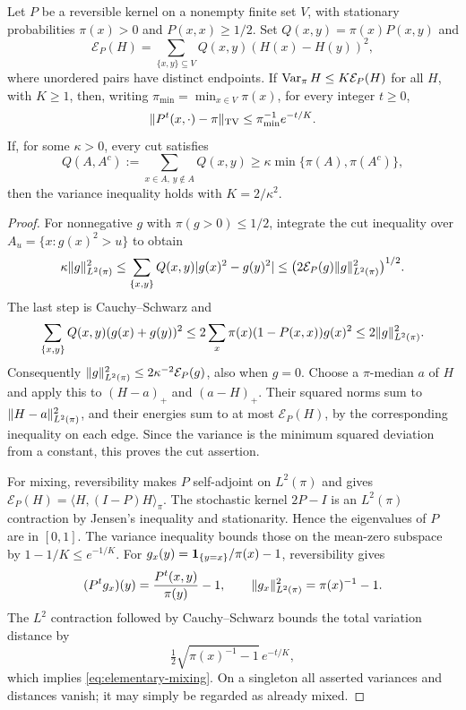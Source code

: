 \begin{lemma}\label{lem:mixing}
Let $P$ be a reversible kernel on a nonempty finite set $V$, with
stationary probabilities $\pi(x)>0$ and $P(x,x)\ge1/2$.
Set $Q(x,y)=\pi(x)P(x,y)$ and
\[
 \mathcal E_P(H)=\sum_{\{x,y\}\subseteq V}
 Q(x,y)(H(x)-H(y))^2,
\]
where unordered pairs have distinct endpoints.  If
$\operatorname{Var}_\pi H\le K\mathcal E_P(H)$ for all $H$, with $K\ge1$, then,
writing $\pi_{\min}=\min_{x\in V}\pi(x)$, for every integer $t\ge0$,
\begin{equation}\label{eq:elementary-mixing}
 \lVert P^t(x,\cdot)-\pi\rVert_{\operatorname{TV}}
 \le \pi_{\min}^{-1}e^{-t/K}.
\end{equation}
If, for some $\kappa>0$, every cut satisfies
\[
 Q(A,A^c):=\sum_{x\in A,\,y\notin A}Q(x,y)
 \ge\kappa\min\{\pi(A),\pi(A^c)\},
\]
then the variance inequality holds with $K=2/\kappa^2$.
\end{lemma}
\begin{proof}
For nonnegative $g$ with $\pi(g>0)\le1/2$, integrate the cut inequality
over $A_u=\{x:g(x)^2>u\}$ to obtain
\[
 \kappa\lVert g\rVert_{L^2(\pi)}^2
 \le\sum_{\{x,y\}}Q(x,y)|g(x)^2-g(y)^2|
 \le\bigl(2\mathcal E_P(g)\lVert g\rVert_{L^2(\pi)}^2\bigr)^{1/2}.
\]
The last step is Cauchy--Schwarz and
\[
 \sum_{\{x,y\}}Q(x,y)(g(x)+g(y))^2
 \le2\sum_x\pi(x)(1-P(x,x))g(x)^2
 \le2\lVert g\rVert_{L^2(\pi)}^2.
\]
Consequently $\lVert g\rVert_{L^2(\pi)}^2\le2\kappa^{-2}\mathcal E_P(g)$,
also when $g=0$.  Choose a $\pi$-median $a$ of $H$ and apply this to
$(H-a)_+$ and $(a-H)_+$.  Their squared norms sum to
$\lVert H-a\rVert_{L^2(\pi)}^2$, and their energies sum to at most
$\mathcal E_P(H)$, by the corresponding inequality on each edge.
Since the variance is the minimum squared deviation from a constant,
this proves the cut assertion.

For mixing, reversibility makes $P$ self-adjoint on $L^2(\pi)$ and gives
$\mathcal E_P(H)=\langle H,(I-P)H\rangle_\pi$.
The stochastic kernel $2P-I$ is an $L^2(\pi)$ contraction by Jensen's
inequality and stationarity.  Hence the eigenvalues of $P$ are in $[0,1]$.
The variance inequality bounds those on the mean-zero subspace by
$1-1/K\le e^{-1/K}$.  For
$g_x(y)=\mathbf{1}_{\{y=x\}}/\pi(x)-1$, reversibility gives
\[
 (P^tg_x)(y)=\frac{P^t(x,y)}{\pi(y)}-1,
 \qquad \lVert g_x\rVert_{L^2(\pi)}^2=\pi(x)^{-1}-1.
\]
The $L^2$ contraction followed by Cauchy--Schwarz bounds the total
variation distance by
\[
 \tfrac12\sqrt{\pi(x)^{-1}-1}\,e^{-t/K},
\]
which implies \eqref{eq:elementary-mixing}.
On a singleton all asserted variances and
distances vanish; it may simply be regarded as already mixed.
\end{proof}

